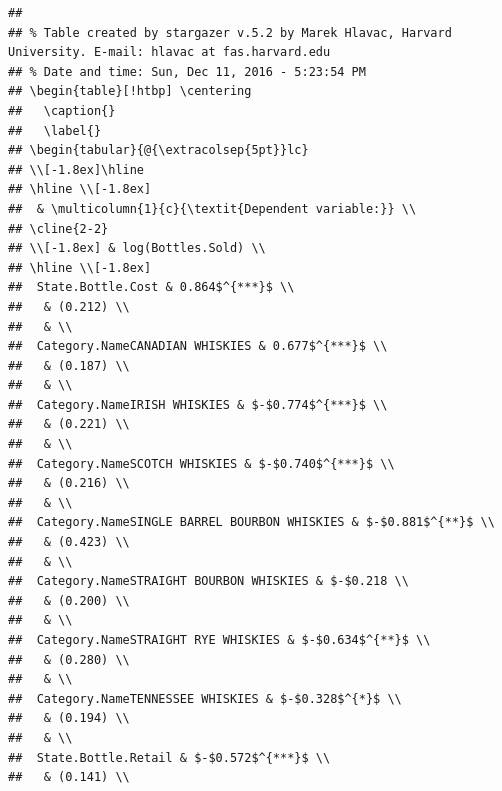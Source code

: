 \documentclass[]{elsarticle} %
\begin{document}
\begin{verbatim}
## 
## % Table created by stargazer v.5.2 by Marek Hlavac, Harvard University. E-mail: hlavac at fas.harvard.edu
## % Date and time: Sun, Dec 11, 2016 - 5:23:54 PM
## \begin{table}[!htbp] \centering 
##   \caption{} 
##   \label{} 
## \begin{tabular}{@{\extracolsep{5pt}}lc} 
## \\[-1.8ex]\hline 
## \hline \\[-1.8ex] 
##  & \multicolumn{1}{c}{\textit{Dependent variable:}} \\ 
## \cline{2-2} 
## \\[-1.8ex] & log(Bottles.Sold) \\ 
## \hline \\[-1.8ex] 
##  State.Bottle.Cost & 0.864$^{***}$ \\ 
##   & (0.212) \\ 
##   & \\ 
##  Category.NameCANADIAN WHISKIES & 0.677$^{***}$ \\ 
##   & (0.187) \\ 
##   & \\ 
##  Category.NameIRISH WHISKIES & $-$0.774$^{***}$ \\ 
##   & (0.221) \\ 
##   & \\ 
##  Category.NameSCOTCH WHISKIES & $-$0.740$^{***}$ \\ 
##   & (0.216) \\ 
##   & \\ 
##  Category.NameSINGLE BARREL BOURBON WHISKIES & $-$0.881$^{**}$ \\ 
##   & (0.423) \\ 
##   & \\ 
##  Category.NameSTRAIGHT BOURBON WHISKIES & $-$0.218 \\ 
##   & (0.200) \\ 
##   & \\ 
##  Category.NameSTRAIGHT RYE WHISKIES & $-$0.634$^{**}$ \\ 
##   & (0.280) \\ 
##   & \\ 
##  Category.NameTENNESSEE WHISKIES & $-$0.328$^{*}$ \\ 
##   & (0.194) \\ 
##   & \\ 
##  State.Bottle.Retail & $-$0.572$^{***}$ \\ 
##   & (0.141) \\ 

\end{verbatim}
\end{document}
